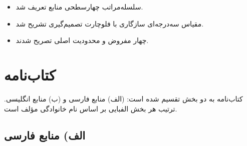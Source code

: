 \documentclass[12pt,a4paper]{book}
\begin{document}
\begin{principleBox}
\begin{itemize}
\item سلسله‌مراتب چهارسطحی منابع تعریف شد.
\item مقیاس سه‌درجه‌ای سازگاری
      با فلوچارت تصمیم‌گیری تشریح شد.
\item چهار مفروض و محدودیت اصلی تصریح شدند.
\end{itemize}
\end{principleBox}



%

\cleardoublepage
{}
{}
\chapter*{کتاب‌نامه}
\label{ch:bibliography}

\begin{infoBox}
کتاب‌نامه به دو بخش تقسیم شده است:
(الف) منابع فارسی و (ب) منابع انگلیسی.
ترتیب هر بخش الفبایی بر اساس نام خانوادگی مؤلف است.
\end{infoBox}

\section*{الف) منابع فارسی}
\end{document}
